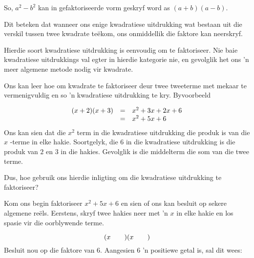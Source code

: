 So, $a^2-b^2$ kan in gefaktoriseerde vorm geskryf word as $(a+b)(a-b)$. \par

Dit beteken dat wanneer ons enige kwadratiese uitdrukking wat bestaan uit die verskil tussen twee kwadrate te\"ekom, ons onmiddellik die faktore kan neerskryf.


Hierdie soort kwadratiese uitdrukking is eenvoudig om te faktoriseer. Nie baie kwadratiese uitdrukkings val egter
in hierdie kategorie nie, en gevolglik het ons ’n meer algemene metode nodig vir kwadrate.
\par 
Ons kan leer hoe om kwadrate te faktoriseer deur twee tweeterme met mekaar te vermenigvuldig en so ’n kwadratiese uitdrukking te kry. Byvoorbeeld

\begin{equation*}
\begin{array}{ccl}\hfill (x+2)(x+3)& =& x^2+3x+2x+6 \\ & =& {x}^{2}+5x+6\hfill \end{array}
\end{equation*}
Ons kan sien dat die ${x}^{2}$ term in die kwadratiese uitdrukking die produk is van die $x$ -terme in elke hakie. Soortgelyk, die $6$ in die kwadratiese uitdrukking is die produk van $2$ en $3$ in die hakies. Gevolglik is die middelterm die
som van die twee terme.\par 
Dus, hoe gebruik ons hierdie inligting om die kwadratiese uitdrukking te faktoriseer?\par 
Kom ons begin faktoriseer ${x}^{2}+5x+6$ en sien of ons kan besluit op sekere algemene reëls. Eerstens, skryf twee hakies neer met ’n $x$ in elke hakie en los spasie vir die oorblywende terme.\par 
\begin{equation*}
(x\phantom{\rule{2.em}{0ex}})(x\phantom{\rule{2.em}{0ex}})
\end{equation*}
Besluit nou op die faktore van $6$. Aangesien $6$ ’n positiewe getal is, sal dit wees:\par 
